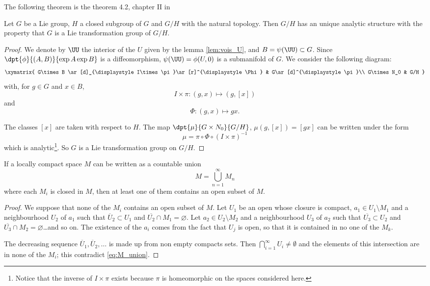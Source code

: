 The following theorem is the theorem 4.2, chapter II in \cite{Helgason}
\begin{theorem}\label{Helgason4.2}\label{tho:struc_anal}
Let $G$ be a Lie group, $H$ a closed subgroup of $G$ and $G/H$ with the natural topology. Then $G/H$ has an unique analytic structure with the property that $G$ is a Lie transformation group of $G/H$.
\end{theorem}

\begin{proof}
We denote by $\UU$ the interior of the $U$ given by the lemma \ref{lem:vois_U}, and $B=\psi(\UU)\subset G$. Since $\dpt{\phi}{(A,B)}{\exp A\exp B}$ is a diffeomorphism, $\psi(\UU)=\phi(U,0)$ is a submanifold of $G$. We consider the following diagram:
\[
\xymatrix{
    G\times B  \ar[d]_{\displaystyle I\times\pi}\ar[r]^{\displaystyle\Phi}    &     
                                                                     G\ar[d]^{\displaystyle\pi}\\
    G\times N_0 &                                                             G/H
  }\]
with, for $g\in G$ and $x\in B$,
\[
I\times\pi\colon (g,x)\mapsto (g,[x])
\]
and
\[
\Phi\colon (g,x)\mapsto gx.
\]

\noindent The classes $[x]$ are taken with respect to $H$. The map $\dpt{\mu}{G\times N_0}{G/H}$, $\mu(g,[x])=[gx]$ can be written under the form
\[
   \mu=\pi\circ\Phi\circ(I\times\pi)^{-1}
\]
which is analytic\footnote{Notice that the inverse of $I\times\pi$ exists because $\pi$ is homeomorphic on the spaces considered here.}. So $G$ is a Lie transformation group on $G/H$.

\end{proof}


\begin{lemma} \label{lem:categ}
If a locally compact space $M$ can be written as a countable union
\begin{equation}\label{eq:M_union}
   M=\bigcup_{n=1}^{\infty}M_n
\end{equation}
where each $M_i$ is closed in $M$, then at least one of them contains an open subset of $M$.
\end{lemma}

\begin{proof}
We suppose that none of the $M_i$ contains an open subset of $M$. Let $U_1$ be an open whose closure is compact, $a_1\in U_1\setminus M_1$ and a neighbourhood $U_2$ of $a_1$ such that $\overline{U}_2\subset U_1$ and $\overline{U_2}\cap M_1=\varnothing$. Let $a_2\in U_2\setminus M_2$ and a neighbourhood $U_3$ of $a_2$ such that $\overline{U_3}\subset U_2$ and $\overline{U_3}\cap M_2=\varnothing$\ldots and so on. The existence of the $a_i$ comes from the fact that $U_j$ is open, so that it is contained in no one of the $M_k$.

The decreasing sequence $\overline{U}_1,\overline{U}_2 ,\ldots$ is made up from non empty compacts sets. Then $\bigcap_{i=1}^{\infty}U_i\neq\emptyset$ and the elements of this intersection are in none of the $M_i$; this contradict \eqref{eq:M_union}.
\end{proof}



